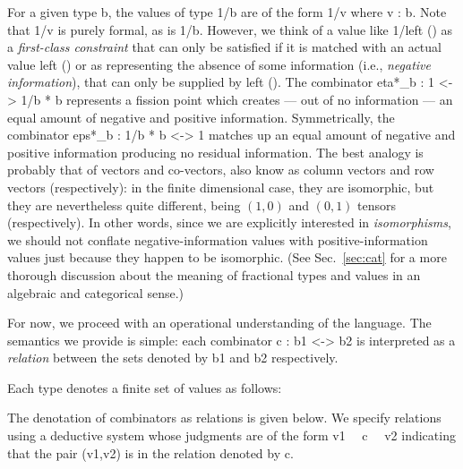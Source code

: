 \documentclass{llncs}
\begin{document}
For a given type {{b}}, the values of type {{1/b}} are of the form {{1/v}}
where {{v : b}}. Note that {{1/v}} is purely formal, as is {{1/b}}.  However,
we think of a value like {{1/left ()}} as a \emph{first-class constraint}
that can only be satisfied if it is matched with an actual value {{left ()}}
or as representing the absence of some information (i.e., \emph{negative
  information}), that can only be supplied by {{left ()}}. The combinator
{{eta*_b : 1 <-> 1/b * b}} represents a fission point which creates --- out
of no information --- an equal amount of negative and positive
information. Symmetrically, the combinator {{eps*_b : 1/b * b <-> 1}} matches
up an equal amount of negative and positive information producing no residual
information.  The best analogy is probably that of vectors and co-vectors,
also know as column vectors and row vectors (respectively): in the finite
dimensional case, they are isomorphic, but they are nevertheless quite
different, being $(1,0)$ and $(0,1)$ tensors (respectively).  In other words,
since we are explicitly interested in \emph{isomorphisms}, we should not
conflate negative-information values with positive-information values just
because they happen to be isomorphic. (See Sec.~\ref{sec:cat} for a more
thorough discussion about the meaning of fractional types and values in an
algebraic and categorical sense.)

For now, we proceed with an operational understanding of the language. The
semantics we provide is simple: each combinator {{c : b1 <-> b2}} is
interpreted as a \emph{relation} between the sets denoted by {{b1}} and
{{b2}} respectively. 

\begin{definition}
\label{chx:def:denot}
Each type denotes a finite set of values as follows:
\end{definition}

The denotation of combinators as relations is given below. We specify
relations using a deductive system whose judgments are of the form 
{{ v1 ~~c~~ v2 }} indicating that the pair {{(v1,v2)}} is in the relation 
denoted by {{c}}.
\end{document}
